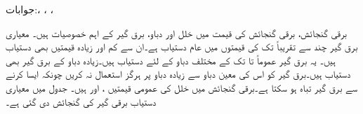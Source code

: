جوابات:، ، ، 

برقی گنجائش، برقی گنجائش  کی قیمت میں خلل اور دباو، برق گیر کے  اہم خصوصیات ہیں۔ معیاری برق گیر چند  سے تقریباً  تک کی قیمتوں میں عام دستیاب ہے۔ان سے کم اور زیادہ قیمتیں بھی دستیاب ہیں۔ یہ برق گیر عموماً  تا  تک کے مختلف دباو کے لئے دستیاب ہیں۔زیادہ دباو کے برق گیر بھی دستیاب ہیں۔برق گیر کو اس کی معین دباو سے زیادہ دباو پر ہرگز استعمال نہ کریں چونکہ ایسا کرنے سے  برق گیر تباہ ہو سکتا ہے۔برقی گنجائش میں خلل کی عمومی قیمتیں ،  اور  ہیں۔ جدول  میں معیاری دستیاب برقی گیر کی گنجائش دی گئی ہے۔

